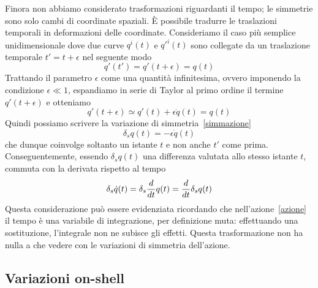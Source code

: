     Finora non abbiamo considerato trasformazioni riguardanti il tempo; le simmetrie sono solo cambi di coordinate spaziali. È possibile tradurre le traslazioni temporali in deformazioni delle coordinate. Consideriamo il caso più semplice unidimensionale dove due curve $q^i(t)$ e $q'^i(t)$ sono collegate da un traslazione temporale $t' = t + \epsilon$ nel seguente modo 
    \begin{equation*}
        q'(t') = q'(t + \epsilon) = q(t)
    \end{equation*} 
    Trattando il parametro $\epsilon$ come una quantità infinitesima, ovvero imponendo la condizione $\epsilon \ll 1$, espandiamo in serie di Taylor al primo ordine il termine $q'(t + \epsilon)$ e otteniamo
    \begin{equation*}
        q'(t + \epsilon) \simeq q'(t) + \epsilon \dot q(t) = q(t)
    \end{equation*}     
    Quindi possiamo scrivere la variazione di simmetria~\eqref{simmazione} 
    \begin{equation}\label{simmtempo}
        \delta_s q(t) = - \epsilon \dot q(t)
    \end{equation}
    che dunque coinvolge soltanto un istante $t$ e non anche $t'$ come prima. Conseguentemente, essendo $\delta_s q(t)$ una differenza valutata allo stesso istante $t$, commuta con la derivata rispetto al tempo
    \begin{equation}\label{commutatore}
        \delta_s \dot q(t) = \delta_s \frac{d}{dt} q(t) = \frac{d}{dt} \delta_s q(t) 
    \end{equation}
    Questa considerazione può essere evidenziata ricordando che nell'azione~\eqref{azione} il tempo è una variabile di integrazione, per definizione muta: effettuando una sostituzione, l'integrale non ne subisce gli effetti. Questa trasformazione non ha nulla a che vedere con le variazioni di simmetria dell'azione. 

\subsection{Variazioni on-shell}


